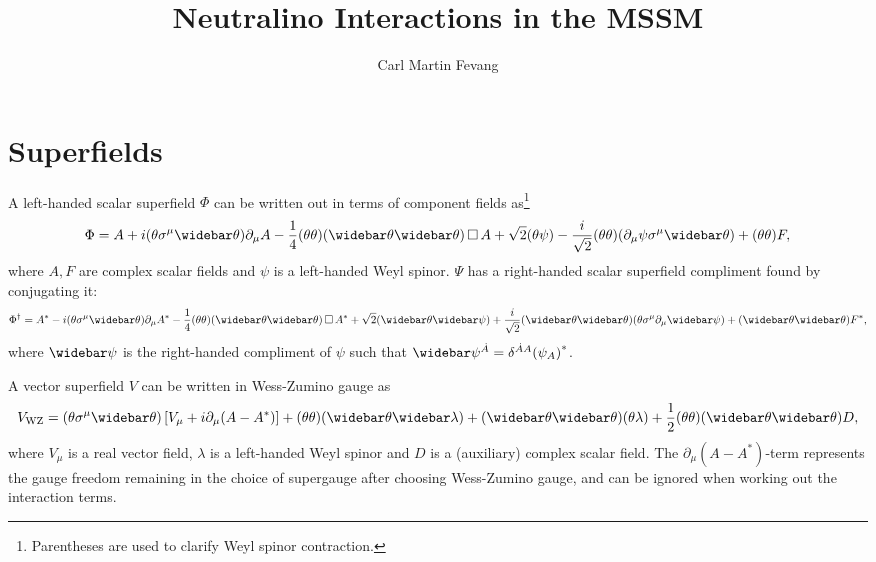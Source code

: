 \documentclass[english, notitlepage]{article}
\title{Neutralino Interactions in the MSSM}
\author{Carl Martin Fevang}
\begin{document}
    \maketitle

    \section{Superfields}
        A left-handed scalar superfield $\Phi$ can be written out in terms of component fields as\footnote{Parentheses are used to clarify Weyl spinor contraction.}
        \begin{align}
            \Phi = A + i(\theta\sigma^\mu\wbar\theta) \partial_\mu A - \frac{1}{4} (\theta\theta)(\wbar\theta\wbar\theta) \dA A + \sqrt{2} (\theta\psi) - \frac{i}{\sqrt{2}} (\theta\theta) (\partial_\mu \psi \sigma^\mu \wbar\theta) + (\theta\theta) F,
        \end{align}
        where $A, F$ are complex scalar fields and $\psi$ is a left-handed Weyl spinor. $\Psi$ has a right-handed scalar superfield compliment found by conjugating it:
        \begin{align}
            \Phi^\dag = A^* - i(\theta\sigma^\mu\wbar\theta) \partial_\mu A^* - \frac{1}{4} (\theta\theta)(\wbar\theta\wbar\theta) \dA A^* + \sqrt{2} (\wbar\theta\wbar\psi) + \frac{i}{\sqrt{2}} (\wbar\theta\wbar\theta) (\theta \sigma^\mu \partial_\mu \wbar\psi) + (\wbar\theta\wbar\theta) F^*,
        \end{align}
        where $\wbar\psi$ is the right-handed compliment of $\psi$ such that $\wbar\psi^{\dot A} = \delta^{\dot A A} {(\psi_A)}^*$.

        A vector superfield $V$ can be written in Wess-Zumino gauge as
        \begin{align}
            \msub{V}{WZ} = (\theta\sigma^\mu\wbar\theta) \bclosed{V_\mu + i\partial_\mu (A - A^*)} + (\theta\theta) (\wbar\theta\wbar\lambda) + (\wbar\theta\wbar\theta)(\theta\lambda) + \frac{1}{2} (\theta\theta)(\wbar\theta\wbar\theta) D,
        \end{align}
        where $V_\mu$ is a real vector field, $\lambda$ is a left-handed Weyl spinor and $D$ is a (auxiliary) complex scalar field. The $\partial_\mu (A-A^*)$-term represents the gauge freedom remaining in the choice of supergauge after choosing Wess-Zumino gauge, and can be ignored when working out the interaction terms.
\end{document}

